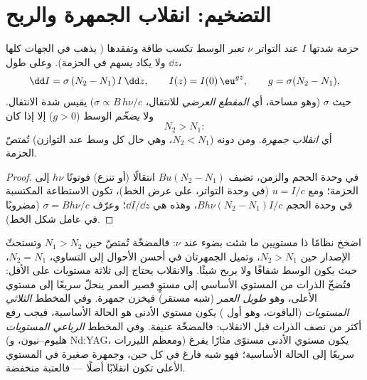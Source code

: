 \section{التضخيم: انقلاب الجمهرة والربح}

\begin{proposition}\label{prop:b2:laser:gain}
حزمة شدتها $I$ عند التواتر $\nu$ تعبر الوسط
تكسب طاقة  وتفقدها 
( يذهب في الجهات كلها ولا يكاد يسهم في
الحزمة). وعلى طول $\dd z$،
\[
\dd I = \sigma\,(N_2 - N_1)\,I\,\dd z, \qquad
I(z) = I(0)\,\eu^{g z}, \qquad g = \sigma(N_2 - N_1),
\]
حيث $\sigma$ (وهو مساحة، أي \emph{المقطع العرضي} للانتقال، $\sigma \propto B\,h\nu/c$) يقيس
شدة الانتقال. ولا \emph{يضخّم} الوسط ($g > 0$)
إلا إذا كان
\[
N_2 > N_1 :
\]
أي \emph{انقلاب جمهرة}. ومن دونه
($N_2 < N_1$، وهي حال كل وسط عند التوازن) تُمتصّ
الحزمة.
\end{proposition}

\begin{proof}
في وحدة الحجم والزمن، تضيف $B u (N_2 - N_1)$ انتقالًا (أو تنزع)
فوتونًا $h\nu$ إلى الحزمة؛ ومع $u = I/c$ (في وحدة التواتر، على
عرض الخط)، تكون الاستطاعة المكتسبة في وحدة الحجم
$B h\nu (N_2 - N_1) I/c$، وهذه هي $\dd I/\dd z$؛ وعرّف $\sigma =
Bh\nu/c$ (مضروبًا في عامل شكل الخط).
\end{proof}

\begin{remark}\label{rem:b2:laser:twolevel}
اضخخ نظامًا ذا مستويين ما شئت بضوء عند $\nu$: فالمضخّة
تُمتصّ حين $N_1 > N_2$ وتستحثّ الإصدار حين $N_2 > N_1$،
وتميل الجمهرتان في أحسن الأحوال إلى التساوي، $N_2 = N_1$، حيث يكون
الوسط شفافًا ولا يربح شيئًا. والانقلاب يحتاج إلى ثلاثة
مستويات على الأقل: فتُضخّ الذرات من المستوي الأساسي إلى مستوٍ قصير العمر
ينحلّ سريعًا إلى مستوي  الأعلى، وهو \emph{طويل العمر}
(شبه مستقر) فيخزن جمهرة. وفي المخطط
\emph{الثلاثي المستويات} (الياقوت، وهو أول
) يكون مستوي  الأدنى هو الحالة الأساسية، فيجب رفع أكثر من نصف
الذرات قبل الانقلاب: فالمضخّة عنيفة. وفي المخطط
\emph{الرباعي المستويات} (هليوم--نيون، و Nd:YAG، ومعظم
الليزرات) يكون مستوي  الأدنى مستوًى مثارًا يفرغ سريعًا
إلى الحالة الأساسية؛ فهو شبه فارغ في كل حين، وجمهرة صغيرة
في المستوي الأعلى تكون انقلابًا أصلًا --- فالعتبة
منخفضة.
\end{remark}

